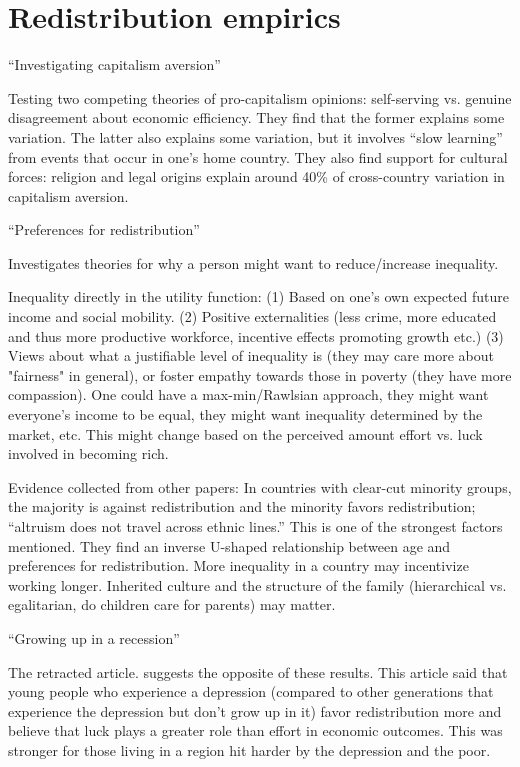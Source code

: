 \documentclass{article}
\begin{document}
\section*{Redistribution empirics}

\noindent \textbf{\cite{landier2008investigating}} ``Investigating capitalism aversion''

Testing two competing theories of pro-capitalism opinions: self-serving vs. genuine disagreement about economic efficiency. They find that the former explains some variation. The latter also explains some variation, but it involves ``slow learning'' from events that occur in one’s home country. They also find support for cultural forces: religion and legal origins explain around 40\% of cross-country variation in capitalism aversion.

\medskip \noindent \textbf{\cite{alesina2011preferences}} ``Preferences for redistribution''

Investigates theories for why a person might want to reduce/increase inequality.

Inequality directly in the utility function: (1) Based on one's own expected future income and social mobility. (2) Positive externalities (less crime, more educated and thus more productive workforce, incentive effects promoting growth etc.) (3) Views about what a justifiable level of inequality is (they may care more about "fairness" in general), or foster empathy towards those in poverty (they have more compassion). One could have a max-min/Rawlsian approach, they might want everyone's income to be equal, they might want inequality determined by the market, etc. This might change based on the perceived amount effort vs. luck involved in becoming rich. 

Evidence collected from other papers: In countries with clear-cut minority groups, the majority is against redistribution and the minority favors redistribution; ``altruism does not travel across ethnic lines.'' This is one of the strongest factors mentioned. They find an inverse U-shaped relationship between age and preferences for redistribution. More inequality in a country may incentivize working longer. Inherited culture and the structure of the family (hierarchical vs. egalitarian, do children care for parents) may matter.

\medskip \noindent \textbf{\cite{giuliano2014retracted}} ``Growing up in a recession''

The retracted article. \textbf{\cite{giuliano2023recessions}} suggests the opposite of these results. This article said that young people who experience a depression (compared to other generations that experience the depression but don’t grow up in it) favor redistribution more and believe that luck plays a greater role than effort in economic outcomes. This was stronger for those living in a region hit harder by the depression and the poor. 
\end{document}
